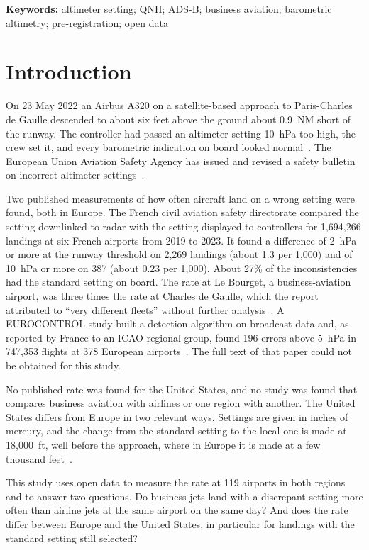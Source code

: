 \documentclass[11pt]{article}
\begin{document}
\noindent\textbf{Keywords:} altimeter setting; QNH; ADS-B; business aviation; barometric altimetry; pre-registration; open data

\section{Introduction}\label{sec:intro}

On 23 May 2022 an Airbus A320 on a satellite-based approach to Paris-Charles de Gaulle descended to about six feet above the ground about 0.9~NM short of the runway. The controller had passed an altimeter setting 10~hPa too high, the crew set it, and every barometric indication on board looked normal~\cite{bea2024}. The European Union Aviation Safety Agency has issued and revised a safety bulletin on incorrect altimeter settings~\cite{easa2025}.

Two published measurements of how often aircraft land on a wrong setting were found, both in Europe. The French civil aviation safety directorate compared the setting downlinked to radar with the setting displayed to controllers for 1{,}694{,}266 landings at six French airports from 2019 to 2023. It found a difference of 2~hPa or more at the runway threshold on 2{,}269 landings (about 1.3 per 1{,}000) and of 10~hPa or more on 387 (about 0.23 per 1{,}000). About 27\% of the inconsistencies had the standard setting on board. The rate at Le Bourget, a business-aviation airport, was three times the rate at Charles de Gaulle, which the report attributed to ``very different fleets'' without further analysis~\cite{dsac2025}. A EUROCONTROL study built a detection algorithm on broadcast data and, as reported by France to an ICAO regional group, found 196 errors above 5~hPa in 747{,}353 flights at 378 European airports~\cite{mourousias2025,grepecas2026}. The full text of that paper could not be obtained for this study.

No published rate was found for the United States, and no study was found that compares business aviation with airlines or one region with another. The United States differs from Europe in two relevant ways. Settings are given in inches of mercury, and the change from the standard setting to the local one is made at 18{,}000~ft, well before the approach, where in Europe it is made at a few thousand feet~\cite{faaaim,dsac2025}.

This study uses open data to measure the rate at 119 airports in both regions and to answer two questions. Do business jets land with a discrepant setting more often than airline jets at the same airport on the same day? And does the rate differ between Europe and the United States, in particular for landings with the standard setting still selected?
\end{document}

